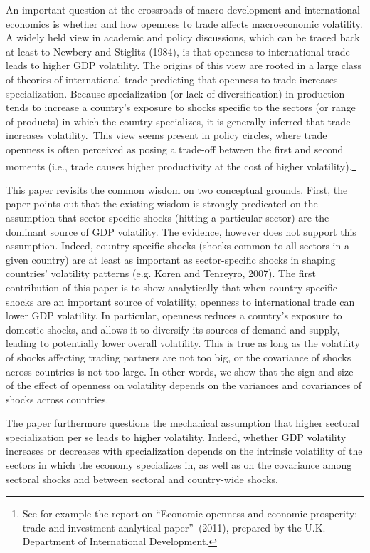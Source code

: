\documentclass[12pt]{article}
\begin{document}
An important question at the crossroads of macro-development and
international economics is whether and how openness to trade affects
macroeconomic volatility. A widely held view in academic and policy
discussions, which can be traced back at least to Newbery and Stiglitz
(1984), is that openness to international trade leads to higher GDP
volatility. The origins of this view are rooted in a large class of theories
of international trade predicting that openness to trade increases
specialization. Because specialization (or lack of diversification) in
production tends to increase a country's exposure to shocks specific to the
sectors (or range of products) in which the country specializes, it is
generally inferred that trade increases volatility.\ This view seems present
in policy circles, where trade openness is often perceived as posing a
trade-off between the first and second moments (i.e., trade causes higher
productivity at the cost of higher volatility).\footnote{%
See for example the report on \textquotedblleft Economic openness and
economic prosperity: trade and investment analytical
paper\textquotedblright\ (2011), prepared by the U.K. Department of
International Development.}

This paper revisits the common wisdom on two conceptual grounds. First, the
paper points out that the existing wisdom is strongly predicated on the
assumption that sector-specific shocks (hitting a particular sector) are the
dominant source of GDP volatility. The evidence, however does not support
this assumption. Indeed, country-specific shocks (shocks common to all
sectors in a given country) are at least as important as sector-specific
shocks in shaping countries' volatility patterns (e.g. Koren and Tenreyro,
2007). The first contribution of this paper is to show analytically that
when country-specific shocks are an important source of volatility, openness
to international trade can lower GDP volatility. In particular, openness
reduces a country's exposure to domestic shocks, and allows it to diversify
its sources of demand and supply, leading to potentially lower overall
volatility. This is true as long as the volatility of shocks affecting
trading partners are not too big, or the covariance of shocks across
countries is not too large. In other words, we show that the sign and size
of the effect of openness on volatility depends on the variances and
covariances of shocks across countries.

The paper furthermore questions the mechanical assumption that higher
sectoral specialization per se leads to higher volatility. Indeed, whether
GDP volatility increases or decreases with specialization depends on the
intrinsic volatility of the sectors in which the economy specializes in, as
well as on the covariance among sectoral shocks and between sectoral and
country-wide shocks.
\end{document}
